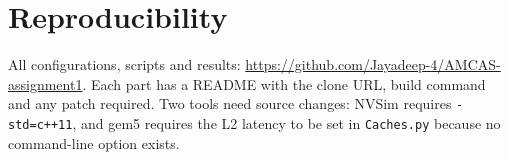 \documentclass[9pt,a4paper]{extarticle}
\begin{document}
\section*{Reproducibility}
\small
All configurations, scripts and results:
\url{https://github.com/Jayadeep-4/AMCAS-assignment1}. Each part has a
README with the clone URL, build command and any patch required. Two tools
need source changes: NVSim requires \texttt{-std=c++11}, and gem5 requires
the L2 latency to be set in \texttt{Caches.py} because no command-line
option exists.
\end{document}
